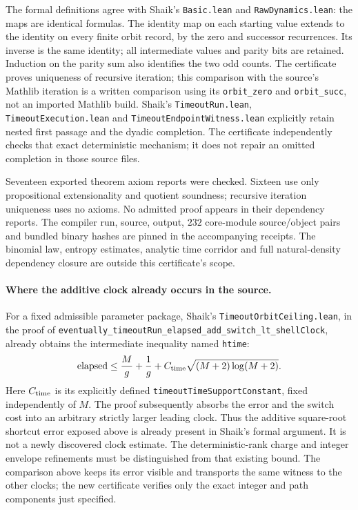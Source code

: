 \documentclass[11pt]{article}
\theoremstyle{remark}\newtheorem{remark}[proposition]{Remark}
\begin{document}
The formal definitions agree with Shaik's \texttt{Basic.lean} and
\texttt{RawDynamics.lean}: the maps are identical formulas.
The identity map on each starting value extends to the identity
on every finite orbit record, by the zero and successor recurrences.
Its inverse is the same identity; all intermediate values and parity
bits are retained. Induction on the parity sum also identifies the
two odd counts. The certificate proves uniqueness of recursive
iteration; this comparison with the source's Mathlib iteration is
a written comparison using its \texttt{orbit\_zero} and
\texttt{orbit\_succ}, not an imported Mathlib build.
Shaik's \texttt{TimeoutRun.lean}, \texttt{TimeoutExecution.lean} and
\texttt{TimeoutEndpointWitness.lean} explicitly retain nested first
passage and the dyadic completion. The certificate independently
checks that exact deterministic mechanism; it does not repair an
omitted completion in those source files.

Seventeen exported theorem axiom reports were checked. Sixteen use
only propositional extensionality and quotient soundness; recursive
iteration uniqueness uses no axioms. No admitted proof appears in
their dependency reports. The compiler run, source, output, \(232\)
core-module source/object pairs and bundled binary hashes are pinned
in the accompanying receipts. The binomial law, entropy estimates,
analytic time corridor and full natural-density dependency closure
are outside this certificate's scope.

\paragraph{Where the additive clock already occurs in the source.}
For a fixed admissible parameter package, Shaik's
\texttt{TimeoutOrbitCeiling.lean}, in the proof of
\texttt{eventually\_timeoutRun\_elapsed\_add\_switch\_lt\_shellClock},
already obtains the intermediate inequality named \texttt{htime}:
\[
 \mathrm{elapsed}\le
 \frac{M}{g}+\frac1g+
 C_{\rm time}\sqrt{(M+2)\log(M+2)}.
\]
Here \(C_{\rm time}\) is its explicitly defined
\texttt{timeoutTimeSupportConstant}, fixed independently of \(M\).
The proof subsequently absorbs the error and the switch cost into
an arbitrary strictly larger leading clock. Thus the additive
square-root shortcut error exposed above is already present in
Shaik's formal argument. It is not a newly discovered clock estimate.
The deterministic-rank charge and integer envelope refinements must
be distinguished from that existing bound. The comparison above
keeps its error visible and transports the same witness to the
other clocks; the new certificate verifies only the exact integer
and path components just specified.
\end{document}
